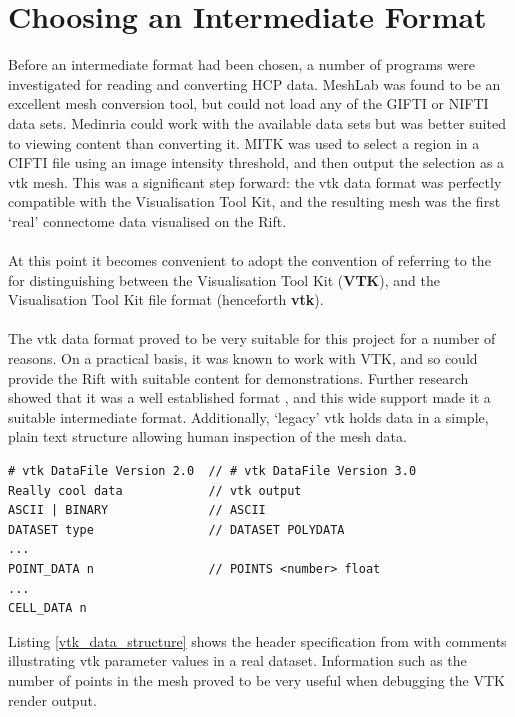 \documentclass[MSc,paper=a4,pagesize=auto]{icldt}
\begin{document}
\section{Choosing an Intermediate Format}
\label{sec:choosing_an_intermediate_format}
Before an intermediate format had been chosen, a number of programs were investigated for reading and converting HCP data. MeshLab \cite{MeshLab2014} was found to be an excellent mesh conversion tool, but could not load any of the GIFTI or NIFTI data sets. Medinria \cite{MedInria2014} could work with the available data sets but was better suited to viewing content than converting it. MITK \cite{MITK2014} was used to select a region in a CIFTI file using an image intensity threshold, and then output the selection as a vtk mesh. This was a significant step forward: the vtk data format was perfectly compatible with the Visualisation Tool Kit, and the resulting mesh was the first `real' connectome data visualised on the Rift.
\\ \\
At this point it becomes convenient to adopt the convention of referring to the for distinguishing between the Visualisation Tool Kit (\textbf{VTK}), and the Visualisation Tool Kit file format (henceforth \textbf{vtk}). 
\\\\
The vtk data format proved to be very suitable for this project for a number of reasons. On a practical basis, it was known to work with VTK, and so could provide the Rift with suitable content for demonstrations. Further research showed that it was a well established format \cite{VTK_file_formats}, and this wide support made it a suitable intermediate format. Additionally, `legacy' vtk holds data in a simple, plain text structure allowing human inspection of the mesh data. 

\begin{lstlisting}[label=vtk_data_structure, caption=The structure of data in a legacy .vtk file.]
# vtk DataFile Version 2.0  // # vtk DataFile Version 3.0
Really cool data            // vtk output
ASCII | BINARY              // ASCII
DATASET type                // DATASET POLYDATA
...
POINT_DATA n                // POINTS <number> float
...
CELL_DATA n
\end{lstlisting}

Listing \ref{vtk_data_structure} shows the header specification from \cite{VTK_file_formats} with comments illustrating vtk parameter values in a real dataset. Information such as the number of points in the mesh proved to be very useful when debugging the VTK render output.
\end{document}
